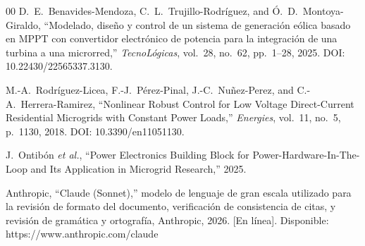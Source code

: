\documentclass[conference]{IEEEtran}
\begin{document}
\begin{thebibliography}{00}
D.~E.~Benavides-Mendoza, C.~L.~Trujillo-Rodríguez, and Ó.~D.~Montoya-Giraldo, ``Modelado, diseño y control de un sistema de generación eólica basado en MPPT con convertidor electrónico de potencia para la integración de una turbina a una microrred,'' \emph{TecnoLógicas}, vol.~28, no.~62, pp.~1--28, 2025. DOI: 10.22430/22565337.3130.

M.-A.~Rodríguez-Licea, F.-J.~Pérez-Pinal, J.-C.~Nuñez-Perez, and C.-A.~Herrera-Ramirez, ``Nonlinear Robust Control for Low Voltage Direct-Current Residential Microgrids with Constant Power Loads,'' \emph{Energies}, vol.~11, no.~5, p.~1130, 2018. DOI: 10.3390/en11051130.

J.~Ontibón \emph{et al.}, ``Power Electronics Building Block for Power-Hardware-In-The-Loop and Its Application in Microgrid Research,'' 2025.

Anthropic, ``Claude (Sonnet),'' modelo de lenguaje de gran escala utilizado para la revisión de formato del documento, verificación de consistencia de citas, y revisión de gramática y ortografía, Anthropic, 2026. [En línea]. Disponible: https://www.anthropic.com/claude

\end{thebibliography}
\end{document}
